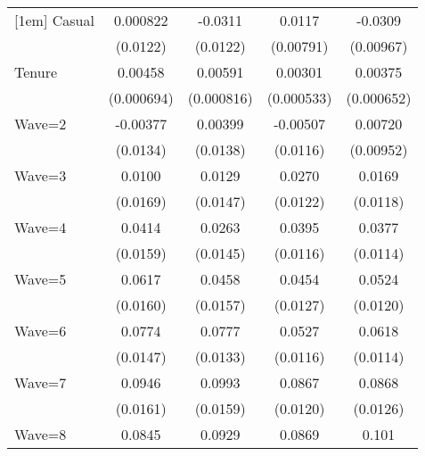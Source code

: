 {\begin{tabular}{l*{4}{c}}
[1em]
Casual              &    0.000822         &     -0.0311\sym{*}  &      0.0117         &     -0.0309\sym{**} \\
                    &    (0.0122)         &    (0.0122)         &   (0.00791)         &   (0.00967)         \\
[1em]
Tenure              &     0.00458\sym{***}&     0.00591\sym{***}&     0.00301\sym{***}&     0.00375\sym{***}\\
                    &  (0.000694)         &  (0.000816)         &  (0.000533)         &  (0.000652)         \\
[1em]
Wave=2              &    -0.00377         &     0.00399         &    -0.00507         &     0.00720         \\
                    &    (0.0134)         &    (0.0138)         &    (0.0116)         &   (0.00952)         \\
[1em]
Wave=3              &      0.0100         &      0.0129         &      0.0270\sym{*}  &      0.0169         \\
                    &    (0.0169)         &    (0.0147)         &    (0.0122)         &    (0.0118)         \\
[1em]
Wave=4              &      0.0414\sym{**} &      0.0263         &      0.0395\sym{***}&      0.0377\sym{***}\\
                    &    (0.0159)         &    (0.0145)         &    (0.0116)         &    (0.0114)         \\
[1em]
Wave=5              &      0.0617\sym{***}&      0.0458\sym{**} &      0.0454\sym{***}&      0.0524\sym{***}\\
                    &    (0.0160)         &    (0.0157)         &    (0.0127)         &    (0.0120)         \\
[1em]
Wave=6              &      0.0774\sym{***}&      0.0777\sym{***}&      0.0527\sym{***}&      0.0618\sym{***}\\
                    &    (0.0147)         &    (0.0133)         &    (0.0116)         &    (0.0114)         \\
[1em]
Wave=7              &      0.0946\sym{***}&      0.0993\sym{***}&      0.0867\sym{***}&      0.0868\sym{***}\\
                    &    (0.0161)         &    (0.0159)         &    (0.0120)         &    (0.0126)         \\
[1em]
Wave=8              &      0.0845\sym{***}&      0.0929\sym{***}&      0.0869\sym{***}&       0.101\sym{***}\\

\end{tabular}}
